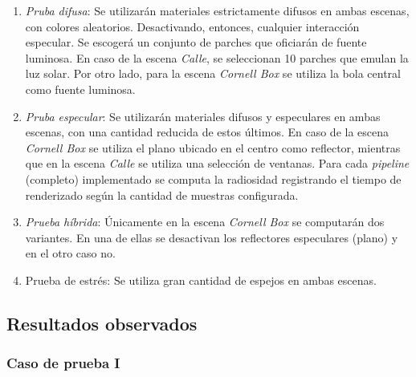 \begin{enumerate}
	\item \textit{Pruba difusa}: Se utilizarán materiales estrictamente difusos en ambas escenas, con colores aleatorios. Desactivando, entonces, cualquier interacción especular. Se escogerá un conjunto de parches que oficiarán de fuente luminosa. En caso de la escena \textit{Calle}, se seleccionan 10 parches que emulan la luz solar. Por otro lado, para la escena \textit{Cornell Box} se utiliza la bola central como fuente luminosa.
	\item \textit{Pruba especular}: Se utilizarán materiales difusos y especulares en ambas escenas, con una cantidad reducida de estos últimos. En caso de la escena \textit{Cornell Box} se utiliza el plano ubicado en el centro como reflector, mientras que en la escena \textit{Calle} se utiliza una selección de ventanas. Para cada \textit{pipeline} (completo) implementado se computa la radiosidad registrando el tiempo de renderizado según la cantidad de muestras configurada.
	\item \textit{Prueba híbrida}: Únicamente en la escena \textit{Cornell Box} se computarán dos variantes. En una de ellas se desactivan los reflectores especulares (plano) y en el otro caso no.
	\item{Prueba de estrés}: Se utiliza gran cantidad de espejos en ambas escenas.
\end{enumerate}

\subsection{Resultados observados}

\subsubsection{Caso de prueba I}

